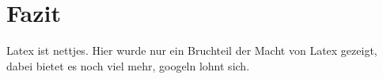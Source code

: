 \section{Fazit}
\label{sec:fazit}
Latex ist nettjes. Hier wurde nur ein Bruchteil der Macht von Latex gezeigt, dabei bietet es noch viel mehr, googeln lohnt sich. 
